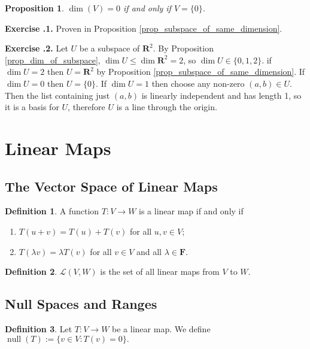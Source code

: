 \documentclass{article}
\newtheorem{proposition}{Proposition}[subsection]
\theoremstyle{definition}
\newtheorem{definition}{Definition}[subsection]
\theoremstyle{remark}
\DeclareMathOperator{\Null}{null}
\newcommand{\R}{\mathbf{R}}
\newcommand{\set}[1]{\{#1\}}
\newenvironment{exc}[1]{\noindent\textbf{Exercise \thesubsection.#1.}}{\medskip}
\begin{document}
\begin{proposition}
   $\dim(V) = 0$ if and only if $V = \set{0}$.
\end{proposition}

\begin{exc}{1}
    Proven in Proposition \ref{prop_subspace_of_same_dimension}.
\end{exc}

\begin{exc}{2}
     Let $U$ be a subspace of $\R^2$. By Proposition \ref{prop_dim_of_subspace}, $\dim{U} \leq \dim{\R^2} = 2$, so $\dim{U} \in \set{0, 1, 2}$. if $\dim{U} = 2$ then $U = \R^2$ by Proposition \ref{prop_subspace_of_same_dimension}. If $\dim{U} = 0$ then $U = \set{0}$. If $\dim{U} = 1$ then choose any non-zero $(a, b) \in U$. Then the list containing just $(a, b)$ is linearly independent and has length 1, so it is a basis for $U$, therefore $U$ is a line through the origin. 
\end{exc}

\section{Linear Maps}

\subsection{The Vector Space of Linear Maps}

\begin{definition}
    A function $T: V \to W$ is a linear map if and only if
    \begin{enumerate}
        \item $T(u + v) = T(u) + T(v)$ for all $u, v \in V$;
        \item $T(\lambda v) = \lambda T(v)$ for all $v \in V$ and all $\lambda \in \mathbf{F}$.
    \end{enumerate}
\end{definition}

\begin{definition}
    $\mathcal{L}(V, W)$ is the set of all linear maps from $V$ to $W$.
\end{definition}

\subsection{Null Spaces and Ranges}

\begin{definition}
    Let $T : V \to W$ be a linear map. We define $\Null(T) := \set{v \in V : T (v) = 0}.$ 
\end{definition}
\end{document}
